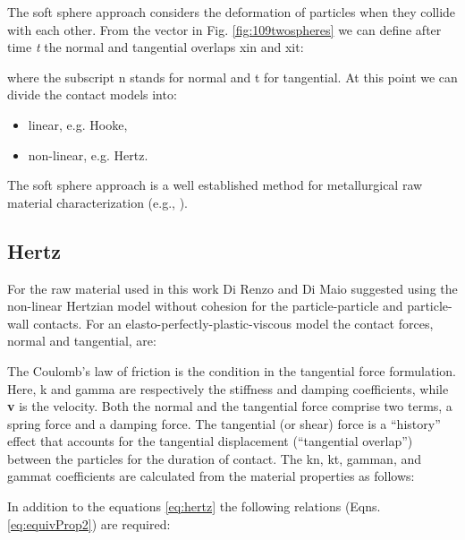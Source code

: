 
The soft sphere approach considers the deformation of particles when they
collide with each other. From the vector in Fig. \ref{fig:109twospheres} we can
define after time \textit{t} the normal and tangential overlaps \acs{xin} and
\acs{xit}:


where the subscript \acs{n} stands for normal and \acs{t} for tangential. 
At this point we can divide the contact models into:
\begin{itemize}
  \item{linear, e.g. Hooke,}
  \item{non-linear, e.g. Hertz.}
\end{itemize}

The soft sphere approach is a well established method for metallurgical raw
material characterization (e.g., \citet{RefWorks:81, RefWorks:92, RefWorks:99,
RefWorks:108}).

\subsection{Hertz}
\label{subsec:hertz}

For the raw material used in this work 
Di Renzo and Di Maio \cite{RefWorks:145} suggested using the non-linear
Hertzian model without cohesion for the particle-particle and particle-wall contacts. 
For an elasto-perfectly-plastic-viscous model the contact forces, normal and
tangential, are:


The Coulomb's law of friction is the condition in the tangential force
formulation.\\
Here, \acs{k} and \acs{gamma} are respectively the stiffness and damping
coefficients, while \textbf{v} is the velocity.
Both the normal and the tangential
force comprise two terms, a spring force and a damping force. 
The tangential (or shear) force is a ``history'' effect that accounts for the
tangential displacement (``tangential overlap'') between the particles for the
duration of contact.
The \acs{kn}, \acs{kt}, \acs{gamman}, and \acs{gammat} coefficients are
calculated from the material properties as follows:

In addition to the equations \ref{eq:hertz} the following relations (Eqns. \ref{eq:equivProp2}) are required:


